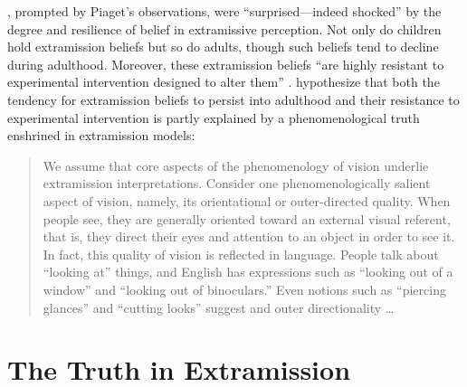 \citet[138]{Winer:1996as}, prompted by Piaget's observations, were ``sur\-pri\-sed---indeed shocked'' by the degree and resilience of belief in extramissive perception. Not only do children hold extramission beliefs but so do adults, though such beliefs tend to decline during adulthood. Moreover, these extramission beliefs ``are highly resistant to experimental intervention designed to alter them'' \citep[138]{Winer:1996as}. \citet{Winer:1996as} hypothesize that both the tendency for extramission beliefs to persist into adulthood and their resistance to experimental intervention is partly explained by a phenomenological truth enshrined in extramission models:
\begin{quote}
	We assume that core aspects of the phenomenology of vision underlie extramission interpretations. Consider one phenomenologically salient aspect of vision, namely, its orientational or outer-directed quality. When people see, they are generally oriented toward an external visual referent, that is, they direct their eyes and attention to an object in order to see it. In fact, this quality of vision is reflected in language. People talk about ``looking at'' things, and English has expressions such as ``looking out of a window'' and ``looking out of binoculars.'' Even notions such as ``piercing glances'' and ``cutting looks'' suggest and outer directionality \ldots\ \citep[140]{Winer:1996as}
\end{quote}


\section{The Truth in Extramission} %
\label{sec:the_truth_in_extramission}



